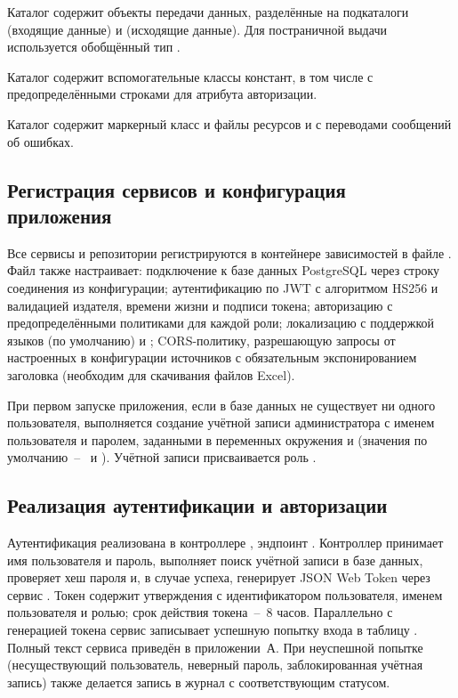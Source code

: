Каталог  содержит объекты передачи данных, разделённые на подкаталоги  (входящие данные) и  (исходящие данные).
Для постраничной выдачи используется обобщённый тип .

Каталог  содержит вспомогательные классы констант, в том числе  с предопределёнными строками для атрибута авторизации.

Каталог  содержит маркерный класс  и файлы ресурсов  и  с переводами сообщений об ошибках.

\subsection{Регистрация сервисов и конфигурация приложения}

Все сервисы и репозитории регистрируются в контейнере зависимостей в файле .
Файл также настраивает: подключение к базе данных PostgreSQL через строку соединения из конфигурации; аутентификацию по JWT с алгоритмом HS256 и валидацией издателя, времени жизни и подписи токена; авторизацию с предопределёнными политиками для каждой роли; локализацию с поддержкой языков  (по умолчанию) и ; CORS-политику, разрешающую запросы от настроенных в конфигурации источников с обязательным экспонированием заголовка  (необходим для скачивания файлов Excel).

При первом запуске приложения, если в базе данных не существует ни одного пользователя, выполняется создание учётной записи администратора с именем пользователя и паролем, заданными в переменных окружения  и  (значения по умолчанию~--~ и ).
Учётной записи присваивается роль .

\subsection{Реализация аутентификации и авторизации}

Аутентификация реализована в контроллере , эндпоинт .
Контроллер принимает имя пользователя и пароль, выполняет поиск учётной записи в базе данных, проверяет хеш пароля и, в случае успеха, генерирует JSON Web Token через сервис .
Токен содержит утверждения с идентификатором пользователя, именем пользователя и ролью; срок действия токена~--~8 часов.
Параллельно с генерацией токена сервис  записывает успешную попытку входа в таблицу .
Полный текст сервиса  приведён в приложении~А.
При неуспешной попытке (несуществующий пользователь, неверный пароль, заблокированная учётная запись) также делается запись в журнал с соответствующим статусом.

